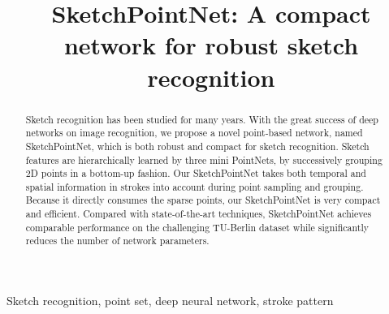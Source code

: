 \documentclass{article}
\title{SketchPointNet: A compact network for robust sketch recognition}
\begin{document}
%
\maketitle
%
\begin{abstract}
Sketch recognition has been studied for many years. 
With the great success of deep networks on image recognition, we propose a novel point-based network, named SketchPointNet, which is both robust and compact for sketch recognition. 
%
Sketch features are hierarchically learned by three mini PointNets, by successively grouping 2D points in a bottom-up fashion. 
%
Our SketchPointNet takes both temporal and spatial information in strokes into account during point sampling and grouping.
%
Because it directly consumes the sparse points, our SketchPointNet is very compact and efficient. 
%
Compared with state-of-the-art techniques, SketchPointNet achieves comparable performance on the challenging TU-Berlin dataset while significantly reduces the number of network parameters. 

 
\end{abstract}

\begin{keywords}
Sketch recognition, point set, deep neural network, stroke pattern 
\end{keywords}







\end{document}
